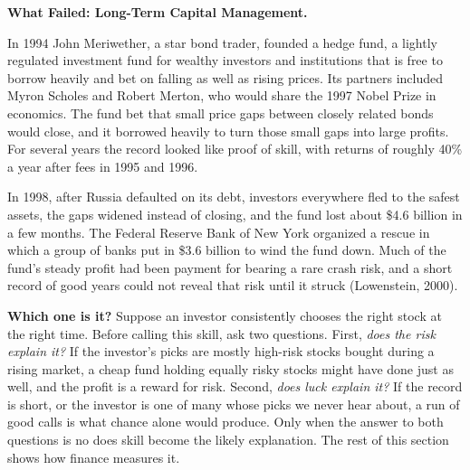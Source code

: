\begin{callout}
\textbf{What Failed: Long-Term Capital Management.} 

In 1994 John Meriwether, a star bond trader, founded a hedge fund, a lightly regulated investment fund for wealthy investors and institutions that is free to borrow heavily and bet on falling as well as rising prices. Its partners included Myron Scholes and Robert Merton, who would share the 1997 Nobel Prize in economics. The fund bet that small price gaps between closely related bonds would close, and it borrowed heavily to turn those small gaps into large profits. For several years the record looked like proof of skill, with returns of roughly 40\% a year after fees in 1995 and 1996. 

In 1998, after Russia defaulted on its debt, investors everywhere fled to the safest assets, the gaps widened instead of closing, and the fund lost about \$4.6 billion in a few months. The Federal Reserve Bank of New York organized a rescue in which a group of banks put in \$3.6 billion to wind the fund down. Much of the fund's steady profit had been payment for bearing a rare crash risk, and a short record of good years could not reveal that risk until it struck (Lowenstein, 2000).
\end{callout}



\noindent\textbf{Which one is it?} Suppose an investor
consistently chooses the right stock at the right time. Before calling this
skill, ask two questions. First, \emph{does the risk explain it?} If the
investor's picks are mostly high-risk stocks bought during a rising market,
a cheap fund holding equally risky stocks might have done just as well, and
the profit is a reward for risk. Second, \emph{does luck explain it?} If the
record is short, or the investor is one of many whose picks we never hear
about, a run of good calls is what chance alone would produce. Only when the
answer to both questions is no does skill become the likely explanation. The
rest of this section shows how finance measures it.

